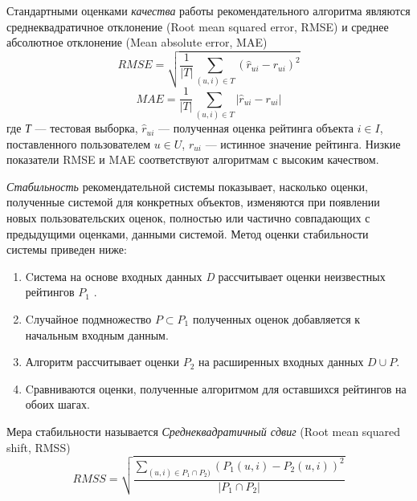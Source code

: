 \documentclass[a4paper, 12pt]{article} %
\begin{document}
Стандартными оценками \textit{качества} работы рекомендательного алгоритма являются среднеквадратичное отклонение (Root mean squared error, RMSE) и среднее абсолютное отклонение (Mean absolute error, MAE)
\[
	RMSE=\sqrt{\frac{1}{|T|}\sum_{(u,i)\in T} (\hat{r}_{ui} - r_{ui})^2}
\]
\[	
	MAE=\frac{1}{|T|}\sum_{(u,i)\in T} |\hat{r}_{ui} - r_{ui}|
\]
где \textit{Т} --- тестовая выборка,  $\hat{r}_{ui}$ --- полученная оценка рейтинга объекта $i \in I$, поставленного пользователем $u \in U$,  $r_{ui}$ --- истинное значение рейтинга. Низкие показатели RMSE и MAE соответствуют алгоритмам с высоким качеством.
  
\par
\textit{Стабильность} рекомендательной системы показывает, насколько оценки, полученные системой для конкретных объектов, изменяются при появлении новых пользовательских оценок, полностью или частично совпадающих с предыдущими оценками, данными системой. Метод оценки стабильности системы приведен ниже:
\begin{enumerate}

\item Cистема  на основе входных данных \textit{D} рассчитывает оценки неизвестных рейтингов $P_{1}$ . 
\item Cлучайное подмножество $P \subset P_{1}$ полученных оценок добавляется к начальным входным данным. 
\item Алгоритм рассчитывает оценки $P_{2}$  на расширенных входных данных $D \cup P$. 
\item Cравниваются оценки, полученные алгоритмом для оставшихся рейтингов на обоих шагах. 
\end{enumerate}
Мера стабильности называется \textit{Среднеквадратичный сдвиг} (Root mean squared shift, RMSS)
\[
	RMSS=\sqrt{\frac{\sum_{(u,i) \in P_{1} \cap P_{2})} (P_{1}(u,i) - P_{2}(u,i))^2}   {|P_{1} \cap P_{2}|}}
\]  
\end{document}
